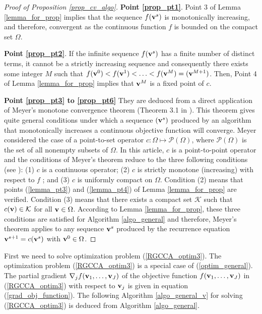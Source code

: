 \documentclass[
]{jss}
\begin{document}
\begin{proof}[Proof of Proposition \ref{prop_cv_algo}]

    \textbf{Point \ref{prop_pt1}}. Point 3 of Lemma \ref{lemma_for_prop} implies 
    that the sequence ${f(\mathbf{v}^s)}$ is monotonically increasing, and therefore, 
    convergent as the continuous function $f$ is bounded on the compact set 
    $\Omega$.

    \textbf{Point \ref{prop_pt2}}. If the infinite sequence ${f(\mathbf{v}^s)}$ has a 
    finite number of distinct terms, it cannot be a strictly increasing sequence 
    and consequently there exists some integer $M$ such that 
    $f(\mathbf{v}^0)<f(\mathbf{v}^1)<\ldots<f(\mathbf{v}^M)=(\mathbf{v}^{M+1})$. Then, Point 4 of 
    Lemma \ref{lemma_for_prop} implies that $\mathbf{v}^M$ is a fixed point of $c$.

    \textbf{Point \ref{prop_pt3} to \ref{prop_pt6}} They are deduced from a direct 
    application of Meyer's monotone convergence theorem (Theorem 3.1 in 
    \cite{Meyer1976}). This theorem gives quite general conditions under which a 
    sequence ${(\mathbf{v}^s)}$ produced by an algorithm that monotonically increases a 
    continuous objective function will converge. Meyer considered the case of a 
    point-to-set operator $c:\Omega\mapsto\mathcal{P}(\Omega)$, where 
    $\mathcal{P}(\Omega)$ is the set of all nonempty subsets of $\Omega$. In this 
    article, $c$ is a point-to-point operator and the conditions of Meyer’s 
    theorem reduce to the three following conditions (see \cite{Fessler2004}): 
    (1) $c$ is a continuous operator; 
    (2) $c$ is strictly monotone (increasing) with respect to $f$ ; and 
    (3) $c$ is uniformly compact on $\Omega$. 
    Condition (2) means that points (\ref{lemma_pt3}) and (\ref{lemma_pt4}) of 
    Lemma \ref{lemma_for_prop} are verified. Condition (3) means that there exists 
    a compact set $\mathcal{K}$ such that $c (\mathbf{v}) \in \mathcal{K}$ for all 
    $\mathbf{v}\in\Omega$. According to Lemma \ref{lemma_for_prop}, these three 
    conditions are satisfied for Algorithm \ref{algo_general} and therefore, 
    Meyer's theorem applies to any sequence ${\mathbf{v}^s}$ produced by the 
    recurrence equation $\mathbf{v}^{s+1} = c(\mathbf{v}^s)$ with $\mathbf{v}^0\in\Omega$. 
\end{proof}

First we need to solve optimization problem (\ref{RGCCA_optim3}). The
optimization problem (\ref{RGCCA_optim3}) is a special case of
(\ref{optim_general}). The partial gradient
\(\mathbf{\nabla}_j f(\mathbf{v}_1, \ldots, \mathbf{v}_J)\) of the objective function
\(f(\mathbf{v}_1, \ldots, \mathbf{v}_J)\) in (\ref{RGCCA_optim3}) with respect to
\(\mathbf{v}_j\) is given in equation (\ref{grad_obj_function}). The
following Algorithm \ref{algo_general_v} for solving
(\ref{RGCCA_optim3}) is deduced from Algorithm \ref{algo_general}.
\end{document}
